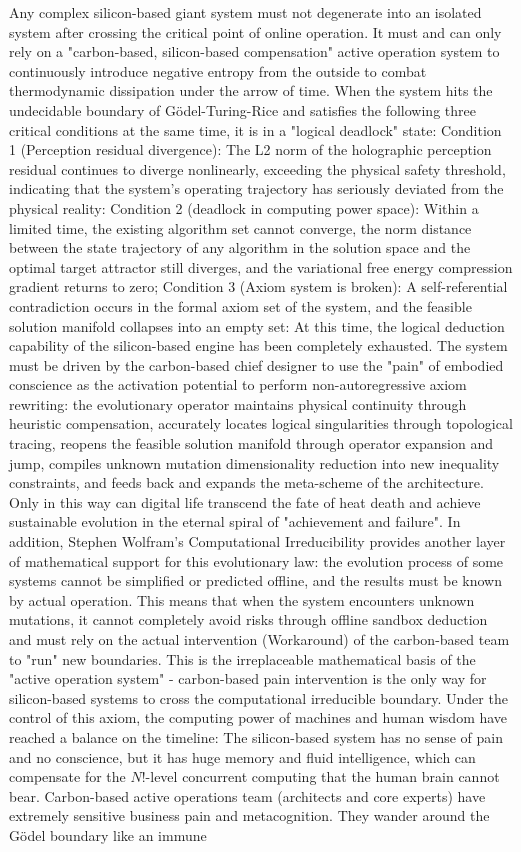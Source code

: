 \documentclass[11pt,a4paper]{article}
\begin{document}
Any complex silicon-based giant system must not degenerate into an isolated system after crossing the critical point of online operation. It must and can only rely on a "carbon-based, silicon-based compensation" active operation system to continuously introduce negative entropy from the outside to combat thermodynamic dissipation under the arrow of time. When the system hits the undecidable boundary of Gödel-Turing-Rice and satisfies the following three critical conditions at the same time, it is in a "logical deadlock" state: Condition 1 (Perception residual divergence): The L2 norm of the holographic perception residual continues to diverge nonlinearly, exceeding the physical safety threshold, indicating that the system's operating trajectory has seriously deviated from the physical reality: Condition 2 (deadlock in computing power space): Within a limited time, the existing algorithm set cannot converge, the norm distance between the state trajectory of any algorithm in the solution space and the optimal target attractor still diverges, and the variational free energy compression gradient returns to zero; Condition 3 (Axiom system is broken): A self-referential contradiction occurs in the formal axiom set of the system, and the feasible solution manifold collapses into an empty set: At this time, the logical deduction capability of the silicon-based engine has been completely exhausted. The system must be driven by the carbon-based chief designer to use the "pain" of embodied conscience as the activation potential to perform non-autoregressive axiom rewriting: the evolutionary operator maintains physical continuity through heuristic compensation, accurately locates logical singularities through topological tracing, reopens the feasible solution manifold through operator expansion and jump, compiles unknown mutation dimensionality reduction into new inequality constraints, and feeds back and expands the meta-scheme of the architecture. Only in this way can digital life transcend the fate of heat death and achieve sustainable evolution in the eternal spiral of "achievement and failure". In addition, Stephen Wolfram's Computational Irreducibility provides another layer of mathematical support for this evolutionary law: the evolution process of some systems cannot be simplified or predicted offline, and the results must be known by actual operation. This means that when the system encounters unknown mutations, it cannot completely avoid risks through offline sandbox deduction and must rely on the actual intervention (Workaround) of the carbon-based team to "run" new boundaries. This is the irreplaceable mathematical basis of the "active operation system" - carbon-based pain intervention is the only way for silicon-based systems to cross the computational irreducible boundary. Under the control of this axiom, the computing power of machines and human wisdom have reached a balance on the timeline: The silicon-based system has no sense of pain and no conscience, but it has huge memory and fluid intelligence, which can compensate for the $N!$-level concurrent computing that the human brain cannot bear. Carbon-based active operations team (architects and core experts) have extremely sensitive business pain and metacognition. They wander around the Gödel boundary like an immune 
\end{document}
